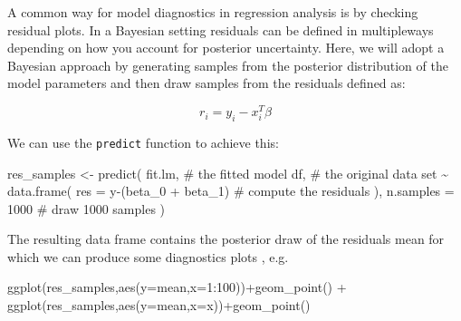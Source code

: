 \documentclass[
  letterpaper,
  DIV=11,
  numbers=noendperiod]{scrartcl}
\newenvironment{Shaded}{\begin{snugshade}}{\end{snugshade}}
\newcommand{\AttributeTok}[1]{\textcolor[rgb]{0.40,0.45,0.13}{#1}}
\newcommand{\CommentTok}[1]{\textcolor[rgb]{0.37,0.37,0.37}{#1}}
\newcommand{\DecValTok}[1]{\textcolor[rgb]{0.68,0.00,0.00}{#1}}
\newcommand{\FunctionTok}[1]{\textcolor[rgb]{0.28,0.35,0.67}{#1}}
\newcommand{\NormalTok}[1]{\textcolor[rgb]{0.00,0.23,0.31}{#1}}
\newcommand{\OtherTok}[1]{\textcolor[rgb]{0.00,0.23,0.31}{#1}}
\newcommand{\SpecialCharTok}[1]{\textcolor[rgb]{0.37,0.37,0.37}{#1}}
\begin{document}
A common way for model diagnostics in regression analysis is by checking
residual plots. In a Bayesian setting residuals can be defined in
multipleways depending on how you account for posterior uncertainty.
Here, we will adopt a Bayesian approach by generating samples from the
posterior distribution of the model parameters and then draw samples
from the residuals defined as:

\[
r_i = y_i - x_i^T\beta
\]

We can use the \texttt{predict} function to achieve this:

\begin{Shaded}
\begin{Highlighting}[]
\NormalTok{res\_samples }\OtherTok{\textless{}{-}} \FunctionTok{predict}\NormalTok{(}
\NormalTok{  fit.lm,         }\CommentTok{\# the fitted model}
\NormalTok{  df,             }\CommentTok{\# the original data set}
  \SpecialCharTok{\textasciitilde{}} \FunctionTok{data.frame}\NormalTok{(   }
    \AttributeTok{res =}\NormalTok{ y}\SpecialCharTok{{-}}\NormalTok{(beta\_0 }\SpecialCharTok{+}\NormalTok{ beta\_1)  }\CommentTok{\# compute the residuals}
\NormalTok{  ),}
  \AttributeTok{n.samples =} \DecValTok{1000}   \CommentTok{\# draw 1000 samples}
\NormalTok{)}
\end{Highlighting}
\end{Shaded}

The resulting data frame contains the posterior draw of the residuals
mean for which we can produce some diagnostics plots , e.g.

\begin{Shaded}
\begin{Highlighting}[]
\FunctionTok{ggplot}\NormalTok{(res\_samples,}\FunctionTok{aes}\NormalTok{(}\AttributeTok{y=}\NormalTok{mean,}\AttributeTok{x=}\DecValTok{1}\SpecialCharTok{:}\DecValTok{100}\NormalTok{))}\SpecialCharTok{+}\FunctionTok{geom\_point}\NormalTok{() }\SpecialCharTok{+}
\FunctionTok{ggplot}\NormalTok{(res\_samples,}\FunctionTok{aes}\NormalTok{(}\AttributeTok{y=}\NormalTok{mean,}\AttributeTok{x=}\NormalTok{x))}\SpecialCharTok{+}\FunctionTok{geom\_point}\NormalTok{()}
\end{Highlighting}
\end{Shaded}
\end{document}
